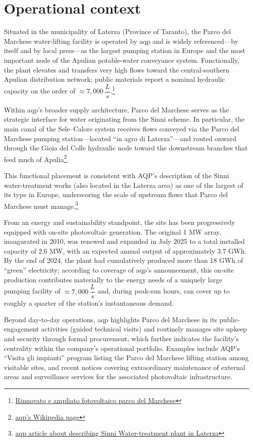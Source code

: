 \section{Operational context}

Situated in the municipality of Laterza (Province of Taranto), the Parco del Marchese water-lifting facility is operated by \acrfull{aqp} and is widely referenced—by  itself and by local press—as the largest pumping station in Europe and the most important node of the Apulian potable-water conveyance system. Functionally, the plant elevates and transfers very high flows toward the central-southern Apulian distribution network; public materials report a nominal hydraulic capacity on the order of $\approx 7,000 ~\dfrac{L}{s}$.\footnote{\href{https://www.aqp.it/aqp-comunica/comunicati-stampa/laterza-rinnovato-e-ampliato-il-fotovoltaico-di-aqp-il-sole-solleva-lacqua-e-migliora-laria}{Rinnovato e ampliato fotovoltaico parco del Marchese}}


Within \acrshort{aqp}’s broader supply architecture, Parco del Marchese serves as the strategic interface for water originating from the Sinni scheme. In particular, the main canal of the Sele–Calore system receives flows conveyed via the Parco del Marchese pumping station—located “in agro di Laterza”—and routed onward through the Gioia del Colle hydraulic node toward the downstream branches that feed much of Apulia\footnote{\href{https://it.wikipedia.org/wiki/Acquedotto_pugliese}{\acrshort{aqp}'s Wikipedia page}}. 

This functional placement is consistent with AQP’s description of the Sinni water-treatment works (also located in the Laterza area) as one of the largest of its type in Europe, underscoring the scale of upstream flows that Parco del Marchese must manage.\footnote{\href{https://www.aqp.it/scopri-acquedotto/gli-impianti/potabilizzatori}{\acrshort{aqp} article about describing Sinni Water-treatment plant in Laterza}} 

From an energy and sustainability standpoint, the site has been progressively equipped with on-site photovoltaic generation. The original 1 MW array, inaugurated in 2010, was renewed and expanded in July 2025 to a total installed capacity of 2.6 MW, with an expected annual output of approximately 3.7 GWh. By the end of 2024, the plant had cumulatively produced more than 18 GWh of “green” electricity; according to coverage of \acrshort{aqp}’s announcement, this on-site production contributes materially to the energy needs of a uniquely large pumping facility of $\approx 7,000 ~\dfrac{L}{s}$ and, during peak-sun hours, can cover up to roughly a quarter of the station’s instantaneous demand. 


Beyond day-to-day operations, \acrshort{aqp} highlights Parco del Marchese in its public-engagement activities (guided technical visits) and routinely manages site upkeep and security through formal procurement, which further indicates the facility’s centrality within the company’s operational portfolio. Examples include AQP’s “Visita gli impianti” program listing the Parco del Marchese lifting station among visitable sites, and recent notices covering extraordinary maintenance of external areas and surveillance services for the associated photovoltaic infrastructure.